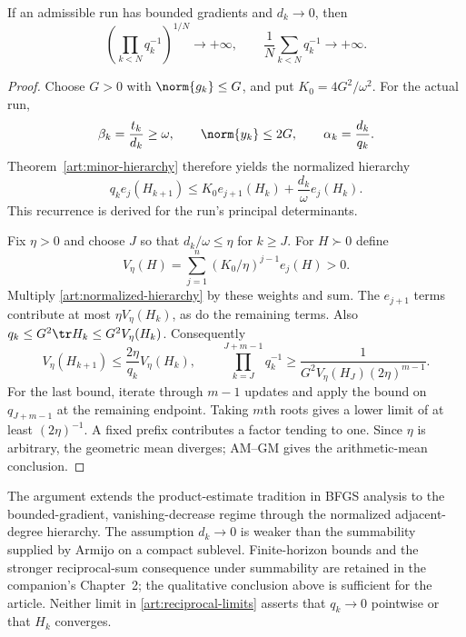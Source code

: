 \begin{theorem}\label{art:reciprocal-growth}
If an admissible run has bounded gradients and $d_k\to0$, then
\begin{equation}\label{art:reciprocal-limits}
 \left(\prod_{k<N}q_k^{-1}\right)^{1/N}\longrightarrow+\infty,
 \qquad \frac1N\sum_{k<N}q_k^{-1}\longrightarrow+\infty.
\end{equation}
\end{theorem}
\begin{proof}
Choose $G>0$ with $\norm{g_k}\le G$, and put $K_0=4G^2/\omega^2$.
For the actual run,
\[
 \beta_k=\frac{t_k}{d_k}\ge \omega,\qquad
 \norm{y_k}\le2G,\qquad \alpha_k=\frac{d_k}{q_k}.
\]
Theorem~\ref{art:minor-hierarchy} therefore yields the normalized hierarchy
\begin{equation}\label{art:normalized-hierarchy}
 q_ke_j(H_{k+1})\le
 K_0e_{j+1}(H_k)+\frac{d_k}{\omega}e_j(H_k).
\end{equation}
This recurrence is derived for the run's principal determinants.

Fix $\eta>0$ and choose $J$ so that $d_k/\omega\le\eta$ for $k\ge J$.
For $H\succ0$ define
\[
 V_\eta(H)=\sum_{j=1}^n(K_0/\eta)^{j-1}e_j(H)>0.
\]
Multiply \eqref{art:normalized-hierarchy} by these weights and sum. The
$e_{j+1}$ terms contribute at most $\eta V_\eta(H_k)$, as do the remaining
terms. Also $q_k\le G^2\tr H_k\le G^2V_\eta(H_k)$. Consequently
\[
 V_\eta(H_{k+1})\le\frac{2\eta}{q_k}V_\eta(H_k),\qquad
 \prod_{k=J}^{J+m-1}q_k^{-1}
 \ge\frac{1}{G^2V_\eta(H_J)(2\eta)^{m-1}}.
\]
For the last bound, iterate through $m-1$ updates and apply the bound on
$q_{J+m-1}$ at the remaining endpoint. Taking $m$th roots gives a lower
limit of at least $(2\eta)^{-1}$. A fixed prefix contributes a factor tending
to one. Since $\eta$ is arbitrary, the geometric mean diverges; AM--GM gives
the arithmetic-mean conclusion.
\end{proof}

The argument extends the product-estimate tradition in BFGS analysis
\cite[Theorem~3.7]{S16}\cite[Appendices C--D]{FND_JJM24AW} to the
bounded-gradient, vanishing-decrease regime through the normalized
adjacent-degree hierarchy. The assumption $d_k\to0$ is weaker than the
summability supplied by Armijo on a compact sublevel. Finite-horizon bounds
and the stronger reciprocal-sum consequence under summability are retained
in the companion's Chapter~2; the qualitative conclusion above is sufficient
for the article. Neither limit in \eqref{art:reciprocal-limits} asserts that
$q_k\to0$ pointwise or that $H_k$ converges.

